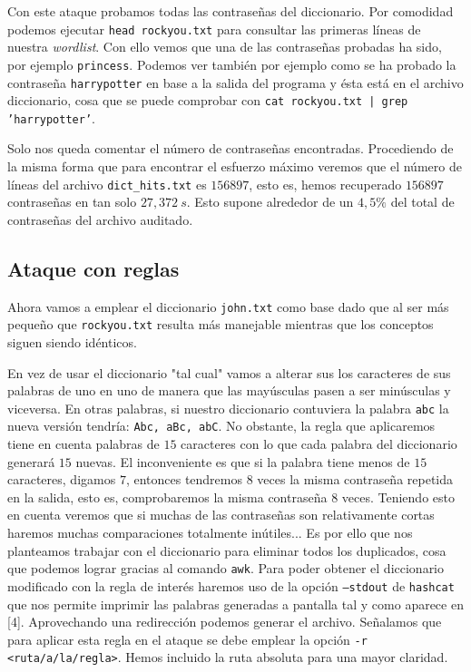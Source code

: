 \documentclass{article}
\begin{document}
            Con este ataque probamos todas las contraseñas del diccionario. Por comodidad podemos ejecutar \texttt{head rockyou.txt} para consultar las primeras líneas de nuestra \textit{wordlist}. Con ello vemos que una de las contraseñas probadas ha sido, por ejemplo \texttt{princess}. Podemos ver también por ejemplo como se ha probado la contraseña \texttt{harrypotter} en base a la salida del programa y ésta está en el archivo diccionario, cosa que se puede comprobar con \texttt{cat rockyou.txt | grep 'harrypotter'}.

            Solo nos queda comentar el número de contraseñas encontradas. Procediendo de la misma forma que para encontrar el esfuerzo máximo veremos que el número de líneas del archivo \texttt{dict\_hits.txt} es $156897$, esto es, hemos recuperado $156897$ contraseñas en tan solo $27,372\ s$. Esto supone alrededor de un $4,5\%$ del total de contraseñas del archivo auditado.

        \subsection{Ataque con reglas}
            Ahora vamos a emplear el diccionario \texttt{john.txt} como base dado que al ser más pequeño que \texttt{rockyou.txt} resulta más manejable mientras que los conceptos siguen siendo idénticos.

            En vez de usar el diccionario "tal cual" vamos a alterar sus los caracteres de sus palabras de uno en uno de manera que las mayúsculas pasen a ser minúsculas y viceversa. En otras palabras, si nuestro diccionario contuviera la palabra \texttt{abc} la nueva versión tendría: \texttt{Abc, aBc, abC}. No obstante, la regla que aplicaremos tiene en cuenta palabras de $15$ caracteres con lo que cada palabra del diccionario generará $15$ nuevas. El inconveniente es que si la palabra tiene menos de $15$ caracteres, digamos $7$, entonces tendremos $8$ veces la misma contraseña repetida en la salida, esto es, comprobaremos la misma contraseña $8$ veces. Teniendo esto en cuenta veremos que si muchas de las contraseñas son relativamente cortas haremos muchas comparaciones totalmente inútiles... Es por ello que nos planteamos trabajar con el diccionario para eliminar todos los duplicados, cosa que podemos lograr gracias al comando \texttt{awk}. Para poder obtener el diccionario modificado con la regla de interés haremos uso de la opción \texttt{--stdout} de \texttt{hashcat} que nos permite imprimir las palabras generadas a pantalla tal y como aparece en [4]. Aprovechando una redirección podemos generar el archivo. Señalamos que para aplicar esta regla en el ataque se debe emplear la opción \texttt{-r <ruta/a/la/regla>}. Hemos incluido la ruta absoluta para una mayor claridad.
\end{document}
